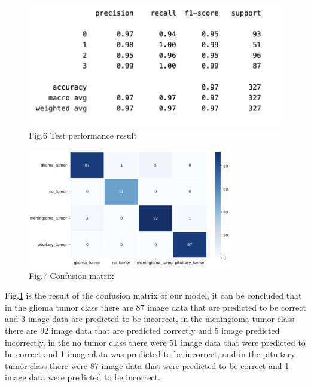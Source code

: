 \documentclass[12pt]{article}
\begin{document}
	\begin{center}
\begin{figure}[H]
\includegraphics[width=1\textwidth]{Figs/pr}
\caption{Fig.6 Test performance result}
\end{figure}
\end{center}


\begin{center}
\begin{figure}[H]
\includegraphics[width=0.8\textwidth]{Figs/CM2}
\caption{Fig.7 Confusion matrix}
\label{fig:CM}
\end{figure}
\end{center}

Fig.\ref{fig:CM} is the result of the confusion matrix of our model, it can be concluded that in the glioma tumor class there are 87  image  data  that  are  predicted  to  be  correct  and  3 image   data   are   predicted   to   be   incorrect,   in   the meningioma tumor class there are 92 image data that are predicted correctly and   5 image predicted incorrectly, in the no tumor class there were 51 image data that were predicted to be correct and 1 image 
data  was  predicted  to  be  incorrect,  and  in  the  pituitary tumor class there were 87 image data that were predicted to  be  correct  and  1  image  data  were  predicted  to  be incorrect.
\end{document}
